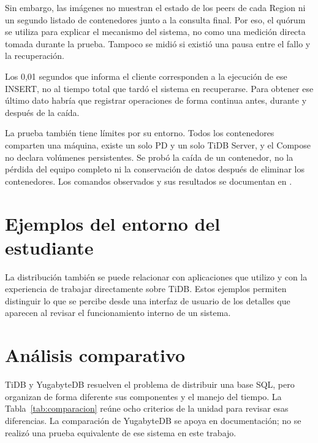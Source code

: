 \documentclass[11pt,a4paper]{article}
\begin{document}
Sin embargo, las imágenes no muestran el estado de los peers de cada Region ni un segundo listado de contenedores junto a la consulta final. Por eso, el quórum se utiliza para explicar el mecanismo del sistema, no como una medición directa tomada durante la prueba. Tampoco se midió si existió una pausa entre el fallo y la recuperación.

Los 0,01 segundos que informa el cliente corresponden a la ejecución de ese INSERT, no al tiempo total que tardó el sistema en recuperarse. Para obtener ese último dato habría que registrar operaciones de forma continua antes, durante y después de la caída.

La prueba también tiene límites por su entorno. Todos los contenedores comparten una máquina, existe un solo PD y un solo TiDB Server, y el Compose no declara volúmenes persistentes. Se probó la caída de un contenedor, no la pérdida del equipo completo ni la conservación de datos después de eliminar los contenedores. Los comandos observados y sus resultados se documentan en .

\section{Ejemplos del entorno del estudiante}
La distribución también se puede relacionar con aplicaciones que utilizo y con la experiencia de trabajar directamente sobre TiDB. Estos ejemplos permiten distinguir lo que se percibe desde una interfaz de usuario de los detalles que aparecen al revisar el funcionamiento interno de un sistema.



\section{Análisis comparativo}
TiDB y YugabyteDB resuelven el problema de distribuir una base SQL, pero organizan de forma diferente sus componentes y el manejo del tiempo. La Tabla~\ref{tab:comparacion} reúne ocho criterios de la unidad para revisar esas diferencias. La comparación de YugabyteDB se apoya en documentación; no se realizó una prueba equivalente de ese sistema en este trabajo.
\end{document}
